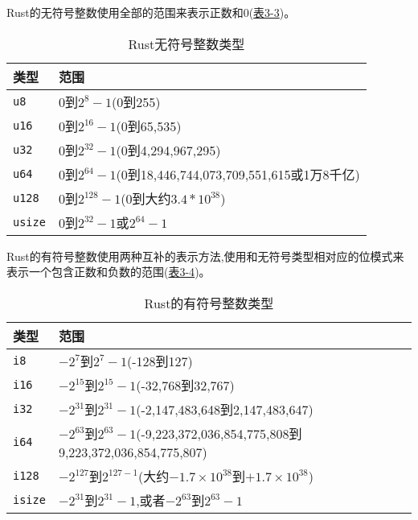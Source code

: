 Rust的无符号整数使用全部的范围来表示正数和0(\hyperref[t3-3]{表3-3})。
\begin{table}[htbp]
    \centering
    \caption{Rust无符号整数类型}
    \label{t3-3}
    \begin{tabular}{ll}
        \hline
        \textbf{类型}   &   \textbf{范围}                   \\
        \hline
        \texttt{u8}     & 0到$2^{8}-1$(0到255)            \\
        \rowcolor{tablecolor} 
        \texttt{u16}    & 0到$2^{16}-1$(0到65,535)        \\
        \texttt{u32}    & 0到$2^{32}-1$(0到4,294,967,295) \\
        \rowcolor{tablecolor} 
        \texttt{u64}    & 0到$2^{64}-1$(0到18,446,744,073,709,551,615或1万8千亿)  \\
        \texttt{u128}   & 0到$2^{128}-1$(0到大约$3.4*10^{38}$)                    \\
        \rowcolor{tablecolor} 
        \texttt{usize}  & 0到$2^{32}-1$或$2^{64}-1$         \\
    \end{tabular}
\end{table}

Rust的有符号整数使用两种互补的表示方法,使用和无符号类型相对应的位模式来表示一个包含正数和负数的范围(\hyperref[t3-4]{表3-4})。
\begin{table}[htbp]
    \centering
    \caption{Rust的有符号整数类型}
    \label{t3-4}
    \begin{tabular}{ll}
        \hline
        \textbf{类型}   &   \textbf{范围}   \\
        \hline
        \texttt{i8}     & $-2^{7}$到$2^{7}-1$(-128到127)   \\
        \rowcolor{tablecolor}
        \texttt{i16}    & $-2^{15}$到$2^{15}-1$(-32,768到32,767)  \\
        \texttt{i32}    & $-2^{31}$到$2^{31}-1$(-2,147,483,648到2,147,483,647)    \\
        \rowcolor{tablecolor}
        \texttt{i64}    & $-2^{63}$到$2^{63}-1$(-9,223,372,036,854,775,808到9,223,372,036,854,775,807)    \\
        \texttt{i128}   & $-2^{127}$到$2^{127-1}$(大约$-1.7\times10^{38}$到$+1.7\times10^{38}$) \\
        \rowcolor{tablecolor}
        \texttt{isize}  & $-2^{31}$到$2^{31}-1$,或者$-2^{63}$到$2^{63}-1$  \\
    \end{tabular}
\end{table}

